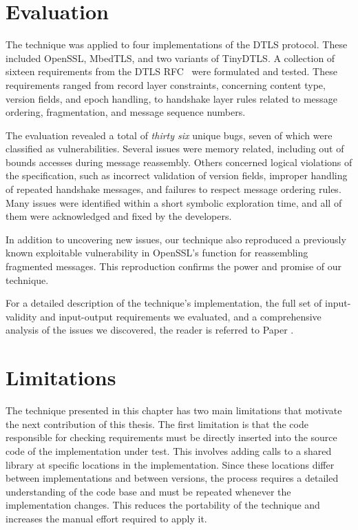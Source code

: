 \section{Evaluation}
The technique was applied to four implementations of the DTLS protocol. These included OpenSSL, MbedTLS, and two variants of TinyDTLS. 
A collection of sixteen requirements from the DTLS RFC~\cite{RFC6347} were formulated and tested. These requirements ranged from record layer constraints, concerning content type, version fields, and epoch handling, to handshake layer rules related to message ordering, fragmentation, and message sequence numbers.

The evaluation revealed a total of \emph{thirty six} unique bugs, seven of which were classified as vulnerabilities. Several issues were memory related, including out of bounds accesses during message reassembly. Others concerned logical violations of the specification, such as incorrect validation of version fields, improper handling of repeated handshake messages, and failures to respect message ordering rules. Many issues were identified within a short symbolic exploration time, and all of them were acknowledged and fixed by the developers.

In addition to uncovering new issues, our technique also reproduced a previously known exploitable vulnerability in OpenSSL's function for reassembling fragmented messages.
This reproduction confirms the power and promise of our technique.

For a detailed description of the technique's implementation, the full set of input-validity and input-output requirements we evaluated, and a comprehensive analysis of the issues we discovered, the reader is referred to Paper .

\section{Limitations}\label{sec:paper1-limitations}
The technique presented in this chapter has two main limitations that motivate the next contribution of this thesis.
The first limitation is that the code responsible for checking requirements must be directly inserted into the source code of the implementation under test.
This involves adding calls to a shared library at specific locations in the implementation.
Since these locations differ between implementations and between versions, the process requires a detailed understanding of the code base and must be repeated whenever the implementation changes.
This reduces the portability of the technique and increases the manual effort required to apply it.

